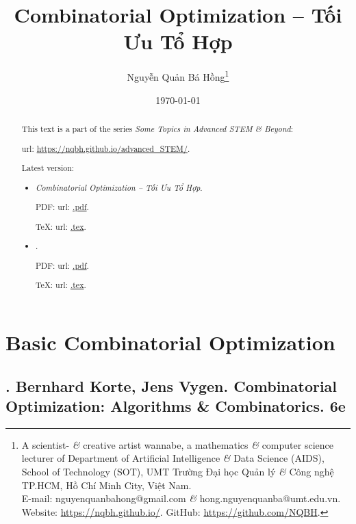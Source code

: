 \documentclass{article}
\title{Combinatorial Optimization -- Tối Ưu Tổ Hợp}
\author{Nguyễn Quản Bá Hồng\footnote{A scientist- {\it\&} creative artist wannabe, a mathematics {\it\&} computer science lecturer of Department of Artificial Intelligence {\it\&} Data Science (AIDS), School of Technology (SOT), UMT Trường Đại học Quản lý {\it\&} Công nghệ TP.HCM, Hồ Chí Minh City, Việt Nam.\\E-mail: {\sf nguyenquanbahong@gmail.com} {\it\&} {\sf hong.nguyenquanba@umt.edu.vn}. Website: \url{https://nqbh.github.io/}. GitHub: \url{https://github.com/NQBH}.}}
\date{\today}
\begin{document}
\maketitle
\begin{abstract}
    This text is a part of the series {\it Some Topics in Advanced STEM \& Beyond}:

    {\sc url}: \url{https://nqbh.github.io/advanced_STEM/}.

    Latest version:
    \begin{itemize}
        \item {\it Combinatorial Optimization -- Tối Ưu Tổ Hợp}.

        PDF: {\sc url}: \url{.pdf}.

        \TeX: {\sc url}: \url{.tex}.
        \item {\it }.

        PDF: {\sc url}: \url{.pdf}.

        \TeX: {\sc url}: \url{.tex}.
    \end{itemize}
\end{abstract}
\tableofcontents


\section{Basic Combinatorial Optimization}


\subsection{\cite{Korte_Vygen2018}. {\sc Bernhard Korte, Jens Vygen}. Combinatorial Optimization: Algorithms \& Combinatorics. 6e}
\end{document}
